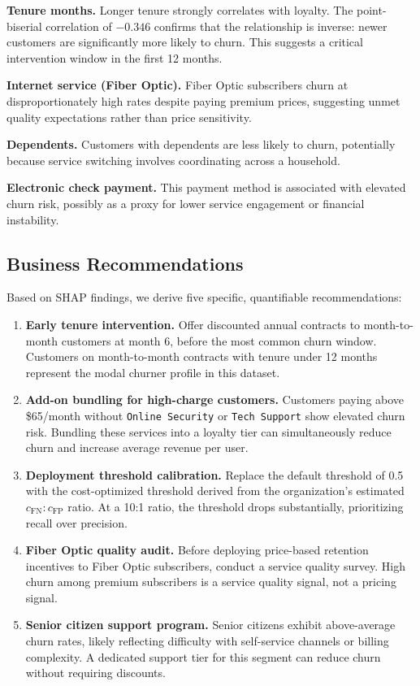 \documentclass{article}
\begin{document}
\textbf{Tenure months.} Longer tenure strongly correlates with loyalty. The
point-biserial correlation of $-0.346$ confirms that the relationship is inverse:
newer customers are significantly more likely to churn. This suggests a critical
intervention window in the first 12 months.

\textbf{Internet service (Fiber Optic).} Fiber Optic subscribers churn at
disproportionately high rates despite paying premium prices, suggesting unmet
quality expectations rather than price sensitivity.

\textbf{Dependents.} Customers with dependents are less likely to churn, potentially
because service switching involves coordinating across a household.

\textbf{Electronic check payment.} This payment method is associated with elevated
churn risk, possibly as a proxy for lower service engagement or financial instability.

\subsection{Business Recommendations}

Based on SHAP findings, we derive five specific, quantifiable recommendations:

\begin{enumerate}
  \item \textbf{Early tenure intervention.} Offer discounted annual contracts to
        month-to-month customers at month 6, before the most common churn window.
        Customers on month-to-month contracts with tenure under 12 months represent
        the modal churner profile in this dataset.

  \item \textbf{Add-on bundling for high-charge customers.} Customers paying above
        \$65/month without \texttt{Online Security} or \texttt{Tech Support} show
        elevated churn risk. Bundling these services into a loyalty tier can simultaneously
        reduce churn and increase average revenue per user.

  \item \textbf{Deployment threshold calibration.} Replace the default threshold of 0.5
        with the cost-optimized threshold derived from the organization's estimated
        $c_{\text{FN}}:c_{\text{FP}}$ ratio. At a 10:1 ratio, the threshold drops
        substantially, prioritizing recall over precision.

  \item \textbf{Fiber Optic quality audit.} Before deploying price-based retention
        incentives to Fiber Optic subscribers, conduct a service quality survey.
        High churn among premium subscribers is a service quality signal, not
        a pricing signal.

  \item \textbf{Senior citizen support program.} Senior citizens exhibit
        above-average churn rates, likely reflecting difficulty with self-service
        channels or billing complexity. A dedicated support tier for this segment
        can reduce churn without requiring discounts.
\end{enumerate}
\end{document}
